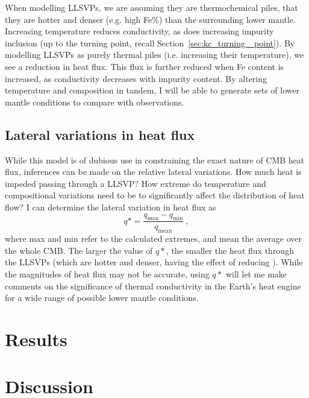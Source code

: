 When modelling LLSVPs, we are assuming they are thermochemical piles, that they are hotter and denser (e.g. high Fe\%) than the surrounding lower mantle. Increasing temperature reduces conductivity, as does increasing impurity inclusion (up to the turning point, recall Section~\ref{sec:kc_turning _point}). By modelling LLSVPs as purely thermal piles (i.e. increasing their temperature), we see a reduction in heat flux. This flux is further reduced when Fe content is increased, as conductivity decreases with impurity content. By altering temperature and composition in tandem, I will be able to generate sets of lower mantle conditions to compare with observations.



\subsection{Lateral variations in heat flux}

While this model is of dubious use in constraining the exact nature of CMB heat flux, inferences can be made on the relative lateral variations. How much heat is impeded passing through a LLSVP? How extreme do temperature and compositional variations need to be to significantly affect the distribution of heat flow? I can determine the lateral variation in heat flux as
%
\begin{equation}
\label{eq.q_star}
q* = \frac{q_{\mathrm{max}}-q_{\mathrm{min}}}{q_{\mathrm{mean}}}\ ,
\end{equation}
%
where max and min refer to the calculated extremes, and mean the average over the whole CMB. The larger the value of $q*$, the smaller the heat flux through the LLSVPs (which are hotter and denser, having the effect of reducing \tc). While the magnitudes of heat flux may not be accurate, using $q*$ will let me make comments on the significance of thermal conductivity in the Earth's heat engine for a wide range of possible lower mantle conditions.


\section{Results}



\section{Discussion}




